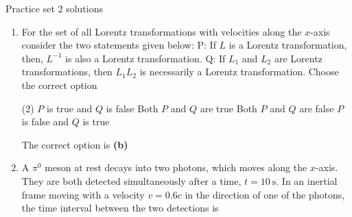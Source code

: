 \newpage
\begin{abox}
	Practice set 2 solutions
	\end{abox}
\begin{enumerate}

	\item For the set of all Lorentz transformations with velocities along the $x$-axis consider the two statements given below:
	P: If $L$ is a Lorentz transformation, then, $L^{-1}$ is also a Lorentz transformation.
	Q: If $L_{1}$ and $L_{2}$ are Lorentz transformations, then $L_{1} L_{2}$ is necessarily a Lorentz transformation.
	Choose the correct option
	{}

\begin{tasks}(2)
	\task[\textbf{A.}] $P$ is true and $Q$ is false
	\task[\textbf{B.}]Both $P$ and $Q$ are true
	\task[\textbf{C.}]Both $P$ and $Q$ are false
	\task[\textbf{D.}]$P$ is false and $Q$ is true
\end{tasks}
\begin{answer}
The correct option is \textbf{(b)}
\end{answer}
	\item A $\pi^{0}$ meson at rest decays into two photons, which moves along the $x$-axis. They are both detected simultaneously after a time, $t=10 \mathrm{~s} .$ In an inertial frame moving with a velocity $v=0.6 c$ in the direction of one of the photons, the time interval between the two detections is
	{}


\end{enumerate}
